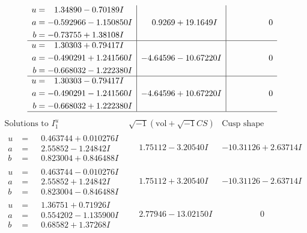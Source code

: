 \documentclass[1p]{elsarticle_modified}
\theoremstyle{definition}
\newcommand{\I}{\sqrt{-1}}
\begin{document}
$$\begin{array}{c|c|c}
\begin{aligned}
u &= \phantom{-}1.34890 - 0.70189 I \\
a &= -0.592966 - 1.150850 I \\
b &= -0.73755 + 1.38108 I\end{aligned}
 & \phantom{-}0.9269 + 19.1649 I & \phantom{-0.000000 } 0 \\ \hline\begin{aligned}
u &= \phantom{-}1.30303 + 0.79417 I \\
a &= -0.490291 + 1.241560 I \\
b &= -0.668032 - 1.222380 I\end{aligned}
 & -4.64596 - 10.67220 I & \phantom{-0.000000 } 0 \\ \hline\begin{aligned}
u &= \phantom{-}1.30303 - 0.79417 I \\
a &= -0.490291 - 1.241560 I \\
b &= -0.668032 + 1.222380 I\end{aligned}
 & -4.64596 + 10.67220 I & \phantom{-0.000000 } 0\\
 \hline 
 \end{array}$$\newpage$$\begin{array}{c|c|c}  
\text{Solutions to }I^u_{1}& \I (\text{vol} + \sqrt{-1}CS) & \text{Cusp shape}\\
 \hline 
\begin{aligned}
u &= \phantom{-}0.463744 + 0.010276 I \\
a &= \phantom{-}2.55852 - 1.24842 I \\
b &= \phantom{-}0.823004 + 0.846488 I\end{aligned}
 & \phantom{-}1.75112 - 3.20540 I & -10.31126 + 2.63714 I \\ \hline\begin{aligned}
u &= \phantom{-}0.463744 - 0.010276 I \\
a &= \phantom{-}2.55852 + 1.24842 I \\
b &= \phantom{-}0.823004 - 0.846488 I\end{aligned}
 & \phantom{-}1.75112 + 3.20540 I & -10.31126 - 2.63714 I \\ \hline\begin{aligned}
u &= \phantom{-}1.36751 + 0.71926 I \\
a &= \phantom{-}0.554202 - 1.135900 I \\
b &= \phantom{-}0.68582 + 1.37268 I\end{aligned}
 & \phantom{-}2.77946 - 13.02150 I & \phantom{-0.000000 } 0 \\ \hline\begin{aligned}

\end{aligned}
\end{array}$$
\end{document}
